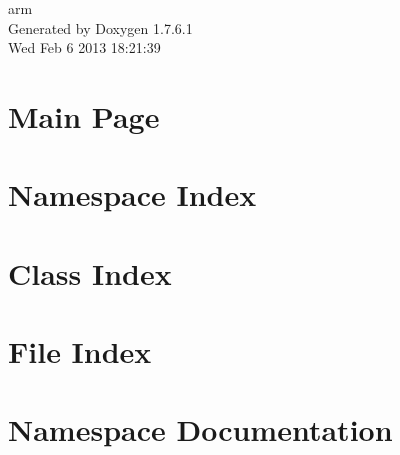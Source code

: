 \documentclass[a4paper]{book}
\begin{document}
\begin{titlepage}
\vspace*{7cm}
\begin{center}
{\Large arm }\\
\vspace*{1cm}
{\large \-Generated by Doxygen 1.7.6.1}\\
\vspace*{0.5cm}
{\small Wed Feb 6 2013 18:21:39}\\
\end{center}
\end{titlepage}
\clearemptydoublepage
{}
\tableofcontents
\clearemptydoublepage
{}
\chapter{\-Main \-Page}
\label{index}
\chapter{\-Namespace \-Index}

\chapter{\-Class \-Index}

\chapter{\-File \-Index}

\chapter{\-Namespace \-Documentation}










\end{document}
